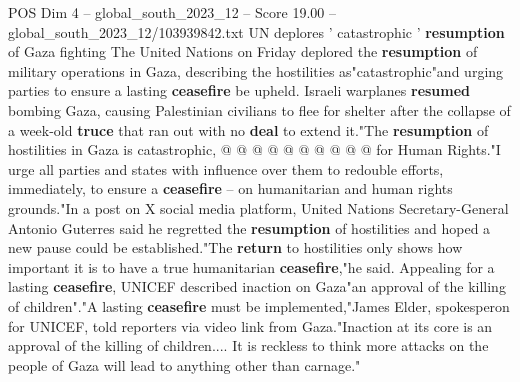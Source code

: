 \begin{textsample}{POS Dim 4 – global\_south\_2023\_12 – Score 19.00 – global\_south\_2023\_12/103939842.txt}
UN deplores ' catastrophic ' \textbf{resumption} of Gaza fighting The United Nations on Friday deplored the \textbf{resumption} of military operations in Gaza, describing the hostilities as"catastrophic"and urging parties to ensure a lasting \textbf{ceasefire} be upheld.
Israeli warplanes \textbf{resumed} bombing Gaza, causing Palestinian civilians to flee for shelter after the collapse of a week-old \textbf{truce} that ran out with no \textbf{deal} to extend it."The \textbf{resumption} of hostilities in Gaza is catastrophic, @ @ @ @ @ @ @ @ @ @ for Human Rights."I urge all parties and states with influence over them to redouble efforts, immediately, to ensure a \textbf{ceasefire} -- on humanitarian and human rights grounds."In a post on X social media platform, United Nations Secretary-General Antonio Guterres said he regretted the \textbf{resumption} of hostilities and hoped a new pause could be established."The \textbf{return} to hostilities only shows how important it is to have a true humanitarian \textbf{ceasefire},"he said.
Appealing for a lasting \textbf{ceasefire}, UNICEF described inaction on Gaza"an approval of the killing of children"."A lasting \textbf{ceasefire} must be implemented,"James Elder, spokesperon for UNICEF, told reporters via video link from Gaza."Inaction at its core is an approval of the killing of children....
It is reckless to think more attacks on the people of Gaza will lead to anything other than carnage."

\end{textsample}
